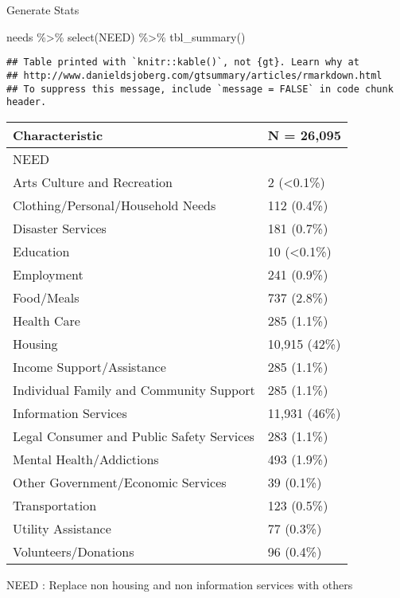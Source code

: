 \documentclass[
]{article}
\newenvironment{Shaded}{\begin{snugshade}}{\end{snugshade}}
\newcommand{\FunctionTok}[1]{\textcolor[rgb]{0.00,0.00,0.00}{#1}}
\newcommand{\NormalTok}[1]{#1}
\newcommand{\SpecialCharTok}[1]{\textcolor[rgb]{0.00,0.00,0.00}{#1}}
\begin{document}
Generate Stats

\begin{Shaded}
\begin{Highlighting}[]
\NormalTok{needs }\SpecialCharTok{\%\textgreater{}\%} \FunctionTok{select}\NormalTok{(NEED) }\SpecialCharTok{\%\textgreater{}\%} \FunctionTok{tbl\_summary}\NormalTok{()}
\end{Highlighting}
\end{Shaded}

\begin{verbatim}
## Table printed with `knitr::kable()`, not {gt}. Learn why at
## http://www.danieldsjoberg.com/gtsummary/articles/rmarkdown.html
## To suppress this message, include `message = FALSE` in code chunk header.
\end{verbatim}

\begin{longtable}[]{@{}ll@{}}
\toprule
\textbf{Characteristic} & \textbf{N = 26,095} \\
\midrule
\endhead
NEED & \\
Arts Culture and Recreation & 2 (\textless0.1\%) \\
Clothing/Personal/Household Needs & 112 (0.4\%) \\
Disaster Services & 181 (0.7\%) \\
Education & 10 (\textless0.1\%) \\
Employment & 241 (0.9\%) \\
Food/Meals & 737 (2.8\%) \\
Health Care & 285 (1.1\%) \\
Housing & 10,915 (42\%) \\
Income Support/Assistance & 285 (1.1\%) \\
Individual Family and Community Support & 285 (1.1\%) \\
Information Services & 11,931 (46\%) \\
Legal Consumer and Public Safety Services & 283 (1.1\%) \\
Mental Health/Addictions & 493 (1.9\%) \\
Other Government/Economic Services & 39 (0.1\%) \\
Transportation & 123 (0.5\%) \\
Utility Assistance & 77 (0.3\%) \\
Volunteers/Donations & 96 (0.4\%) \\
\bottomrule
\end{longtable}

NEED : Replace non housing and non information services with others
\end{document}
